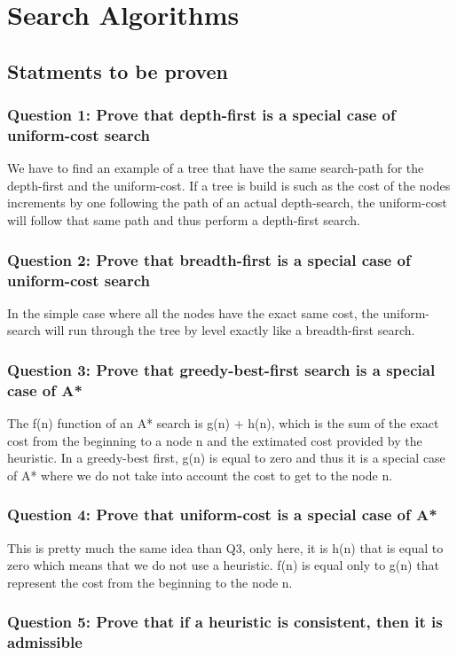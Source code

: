\documentclass[a4paper,10pt]{article}
\begin{document}
	\newpage
	
	\section{Search Algorithms}
		\subsection{Statments to be proven}
			\subsubsection{Question 1: Prove that depth-first is a special case of uniform-cost search}
				We have to find an example of a tree that have the same search-path for the depth-first and the uniform-cost. If a tree is build is such as the cost of the nodes increments by one following the path of an actual depth-search, the uniform-cost will follow that same path and thus perform a depth-first search. 
				
			\subsubsection{Question 2: Prove that breadth-first is a special case of uniform-cost search}	
				In the simple case where all the nodes have the exact same cost, the uniform-search will run through the tree by level exactly like a breadth-first search.
			\subsubsection{Question 3: Prove that greedy-best-first search is a special case of A*}
				The f(n) function of an A* search is g(n) + h(n), which is the sum of the exact cost from the beginning to a node n and the extimated cost provided by the heuristic. In a greedy-best first, g(n) is equal to zero and thus it is a special case of A* where we do not take into account the cost to get to the node n. 
			\subsubsection{Question 4: Prove that uniform-cost is a special case of A*}
				This is pretty much the same idea than Q3, only here, it is h(n) that is equal to zero which means that we do not use a heuristic. f(n) is equal only to g(n) that represent the cost from the beginning to the node n.
			
			\subsubsection{Question 5: Prove that if a heuristic is consistent, then it is admissible}
			
\end{document}
